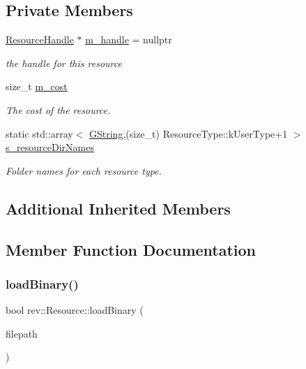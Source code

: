 \subsection*{Private Members}
\begin{DoxyCompactItemize}
\item 
\mbox{\label{classrev_1_1_resource_aae19e1a9916de55285623173adc70e0d}} 
\mbox{\hyperlink{classrev_1_1_resource_handle}{Resource\+Handle}} $\ast$ \mbox{\hyperlink{classrev_1_1_resource_aae19e1a9916de55285623173adc70e0d}{m\+\_\+handle}} = nullptr
\begin{DoxyCompactList}\small\item\em the handle for this resource \end{DoxyCompactList}\item 
\mbox{\label{classrev_1_1_resource_ad61690905d0d542e2f3dec2cc3440f83}} 
size\+\_\+t \mbox{\hyperlink{classrev_1_1_resource_ad61690905d0d542e2f3dec2cc3440f83}{m\+\_\+cost}}
\begin{DoxyCompactList}\small\item\em The cost of the resource. \end{DoxyCompactList}\item 
static std\+::array$<$ \mbox{\hyperlink{classrev_1_1_g_string}{G\+String}},(size\+\_\+t) Resource\+Type\+::k\+User\+Type+1 $>$ \mbox{\hyperlink{classrev_1_1_resource_afff0a0a41f7c96949c1d0bdd5f8d0380}{s\+\_\+resource\+Dir\+Names}}
\begin{DoxyCompactList}\small\item\em Folder names for each resource type. \end{DoxyCompactList}\end{DoxyCompactItemize}
\subsection*{Additional Inherited Members}


\subsection{Member Function Documentation}
\mbox{\label{classrev_1_1_resource_aad752eceda9dab7ea282fb50b894ad4c}} 
\subsubsection{\texorpdfstring{loadBinary()}{loadBinary()}}
{\footnotesize\ttfamily bool rev\+::\+Resource\+::load\+Binary (\begin{DoxyParamCaption}\item[{const \mbox{\hyperlink{classrev_1_1_g_string}{G\+String}} \&}]{filepath }\end{DoxyParamCaption})\hspace{0.3cm}{\ttfamily [virtual]}}



